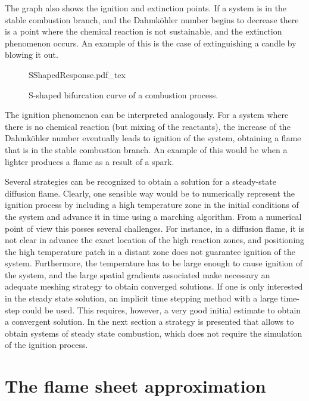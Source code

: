 The graph also shows the ignition and extinction points. If a system is in the stable combustion branch, and the Dahmköhler number begins to decrease there is a point where the chemical reaction is not sustainable, and the extinction phenomenon occurs. An example of this is the case of extinguishing a candle by blowing it out.
\begin{figure}[t]
	\begin{center}
		\def\svgwidth{0.5\textwidth}
		{SShapedResponse.pdf_tex}
		\caption{S-shaped bifurcation curve of a combustion process.}
		\label{fig:Sshaped}%
	\end{center}%
\end{figure}%
The ignition phenomenon can be interpreted analogously. For a system where there is no chemical reaction (but mixing of the reactants), the increase of the Dahmköhler number eventually leads to ignition of the system, obtaining a flame that is in the stable combustion branch. An example of this would be when a lighter produces a flame as a result of a spark. 

Several strategies can be recognized to obtain a solution for a steady-state diffusion flame. Clearly, one sensible way would be to numerically represent the ignition process by including a high temperature zone in the initial conditions of the system and advance it in time using a marching algorithm.  From a numerical point of view this posses several challenges. For instance, in a diffusion flame, it is not clear in advance the exact location of the high reaction zones, and positioning the high temperature patch in a distant zone does not guarantee ignition of the system. Furthermore, the temperature has to be large enough to cause ignition of the system, and the large spatial gradients associated make necessary an adequate meshing strategy to obtain converged solutions. If one is only interested in the steady state solution, an implicit time stepping method with a large time-step could be used. This requires, however, a very good initial estimate to obtain a convergent solution. In the next section a strategy is presented that allows to obtain systems of steady state combustion, which does not require the simulation of the ignition process.


\section{The flame sheet approximation} \label{sec:FlameSheet}

